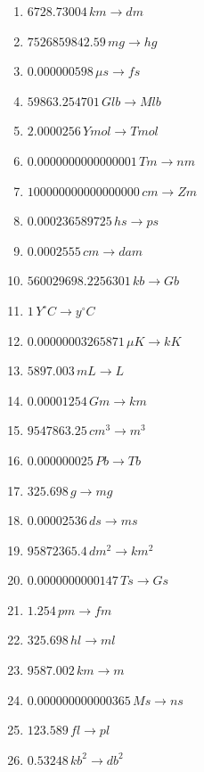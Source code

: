 \begin{frame}
\setlength{\columnsep}{0.5cm} %
\footnotesize
    \begin{multicols}{2}
    \begin{enumerate}
    \item $\num{6728.73004} \,\unit{km}\rightarrow\unit{dm}$
    \item $\num{7526859842.59} \,\unit{mg}\rightarrow\unit{hg}$
    \item $\num{0.000000598} \,\unit{\mu s}\rightarrow\unit{fs}$
    \item $\num{59863.254701} \,\unit{Glb}\rightarrow\unit{Mlb}$
    \item $\num{2.0000256} \,\unit{Ymol}\rightarrow\unit{Tmol}$
    \item $\num{0.0000000000000001} \,\unit{Tm}\rightarrow\unit{nm}$
    \item $\num{100000000000000000} \,\unit{cm}\rightarrow\unit{Zm}$
    \item $\num{0.000236589725} \,\unit{hs}\rightarrow\unit{ps}$
    \item $\num{0.0002555} \,\unit{cm}\rightarrow\unit{dam}$
    \item $\num{560029698.2256301} \,\unit{kb}\rightarrow\unit{Gb}$
    \item $\num{1} \,\unit{Y^\circ C}\rightarrow\unit{y^\circ C}$
    \item $\num{0.00000003265871} \,\unit{\mu K}\rightarrow\unit{kK}$
    \item $\num{5897.003} \,\unit{mL}\rightarrow\unit{L}$
    \item $\num{0.00001254} \,\unit{Gm}\rightarrow\unit{km}$
    \item $\num{9547863.25} \,\unit{cm^3}\rightarrow\unit{m^3}$
    \item $\num{0.000000025} \,\unit{Pb}\rightarrow\unit{Tb}$
    \item $\num{325.698} \,\unit{g}\rightarrow\unit{mg}$
    \item $\num{0.00002536} \,\unit{ds}\rightarrow\unit{ms}$
    \item $\num{95872365.4} \,\unit{dm^2}\rightarrow\unit{km^2}$
    \item $\num{0.0000000000147} \,\unit{Ts}\rightarrow\unit{Gs}$
    \item $\num{1.254} \,\unit{pm}\rightarrow\unit{fm}$
    \item $\num{325.698} \,\unit{hl}\rightarrow\unit{ml}$
    \item $\num{9587.002} \,\unit{km}\rightarrow\unit{m}$
    \item $\num{0.000000000000365} \,\unit{Ms}\rightarrow\unit{ns}$
    \item $\num{123.589} \,\unit{fl}\rightarrow\unit{pl}$
    \item $\num{0.53248} \,\unit{kb^2}\rightarrow\unit{db^2}$
\end{enumerate}
\end{multicols}
\end{frame}


